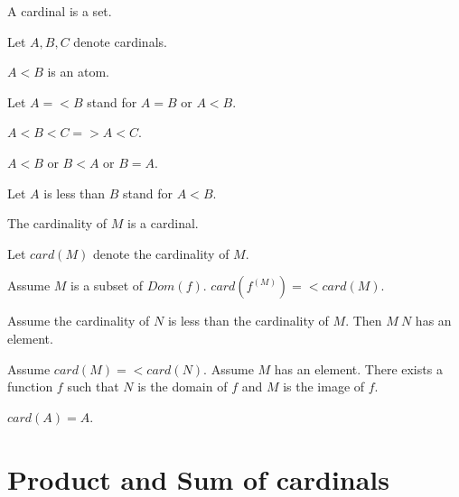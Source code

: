 \documentclass{document}
\begin{document}
  \begin{forthel}
    \begin{signature}
      A cardinal is a set.
    \end{signature}

    Let $A,B,C$ denote cardinals.

    \begin{signature}
      $A < B$ is an atom.
    \end{signature}

    Let $A =< B$ stand for $A = B$ or $A < B$.

    \begin{axiom}
      $A < B < C => A < C$.
    \end{axiom}

    \begin{axiom}
      $A < B$ or $B < A$ or $B = A$.
    \end{axiom}

    Let $A$ is less than $B$ stand for $A < B$.

    \begin{signature}
      The cardinality of $M$ is a cardinal.
    \end{signature}

    Let $card(M)$ denote the cardinality of $M$.

    \begin{axiom}
      Assume $M$ is a subset of $Dom(f)$. $card(f^(M)) =< card(M)$.
    \end{axiom}

    \begin{axiom}
      Assume the cardinality of $N$ is less than the cardinality of $M$. Then $M \ N$ has an element.
    \end{axiom}

    \begin{axiom}
      Assume $card(M) =< card(N)$. Assume $M$ has an element. There exists a
      function $f$ such that $N$ is the domain of $f$ and $M$ is the image of $f$.
    \end{axiom}

    \begin{axiom}
      $card(A) = A$.
    \end{axiom}
  \end{forthel}


  \section*{Product and Sum of cardinals}
\end{document}
